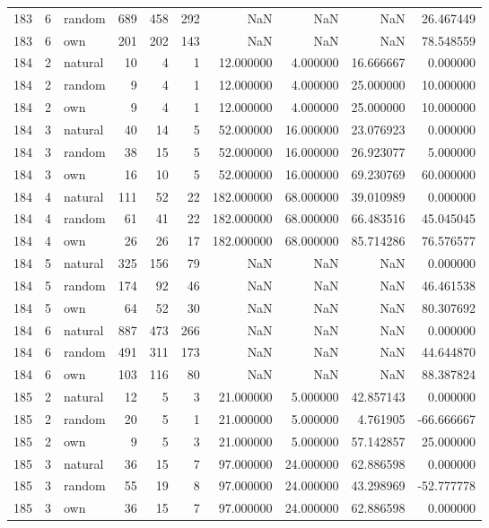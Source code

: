 \begin{table}[htbp]
\begin{tabular}{rrlrrrrrrr}
183 & 6 & random & 689 & 458 & 292 & NaN & NaN & NaN & 26.467449 \\
183 & 6 & own & 201 & 202 & 143 & NaN & NaN & NaN & 78.548559 \\
184 & 2 & natural & 10 & 4 & 1 & 12.000000 & 4.000000 & 16.666667 & 0.000000 \\
184 & 2 & random & 9 & 4 & 1 & 12.000000 & 4.000000 & 25.000000 & 10.000000 \\
184 & 2 & own & 9 & 4 & 1 & 12.000000 & 4.000000 & 25.000000 & 10.000000 \\
184 & 3 & natural & 40 & 14 & 5 & 52.000000 & 16.000000 & 23.076923 & 0.000000 \\
184 & 3 & random & 38 & 15 & 5 & 52.000000 & 16.000000 & 26.923077 & 5.000000 \\
184 & 3 & own & 16 & 10 & 5 & 52.000000 & 16.000000 & 69.230769 & 60.000000 \\
184 & 4 & natural & 111 & 52 & 22 & 182.000000 & 68.000000 & 39.010989 & 0.000000 \\
184 & 4 & random & 61 & 41 & 22 & 182.000000 & 68.000000 & 66.483516 & 45.045045 \\
184 & 4 & own & 26 & 26 & 17 & 182.000000 & 68.000000 & 85.714286 & 76.576577 \\
184 & 5 & natural & 325 & 156 & 79 & NaN & NaN & NaN & 0.000000 \\
184 & 5 & random & 174 & 92 & 46 & NaN & NaN & NaN & 46.461538 \\
184 & 5 & own & 64 & 52 & 30 & NaN & NaN & NaN & 80.307692 \\
184 & 6 & natural & 887 & 473 & 266 & NaN & NaN & NaN & 0.000000 \\
184 & 6 & random & 491 & 311 & 173 & NaN & NaN & NaN & 44.644870 \\
184 & 6 & own & 103 & 116 & 80 & NaN & NaN & NaN & 88.387824 \\
185 & 2 & natural & 12 & 5 & 3 & 21.000000 & 5.000000 & 42.857143 & 0.000000 \\
185 & 2 & random & 20 & 5 & 1 & 21.000000 & 5.000000 & 4.761905 & -66.666667 \\
185 & 2 & own & 9 & 5 & 3 & 21.000000 & 5.000000 & 57.142857 & 25.000000 \\
185 & 3 & natural & 36 & 15 & 7 & 97.000000 & 24.000000 & 62.886598 & 0.000000 \\
185 & 3 & random & 55 & 19 & 8 & 97.000000 & 24.000000 & 43.298969 & -52.777778 \\
185 & 3 & own & 36 & 15 & 7 & 97.000000 & 24.000000 & 62.886598 & 0.000000 \\

\end{tabular}
\end{table}
